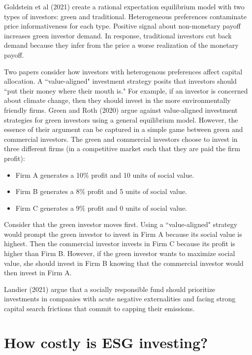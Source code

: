 \documentclass{article}
\begin{document}
Goldstein et al (2021) create a rational expectation equilibrium model with two types of investors: green and traditional. Heterogeneous preferences contaminate price informativeness for each type.  Positive signal about non-monetary payoff increases green investor demand.  In response, traditional investors cut back demand because they infer from the price a worse realization of the monetary payoff.

\bigskip

Two papers consider how investors with heterogenous preferences affect capital allocation. A ``value-aligned" investment strategy posits that investors should ``put their money where their mouth is."  For example, if an investor is concerned about climate change, then they should invest in the more environmentally friendly firms. Green and Roth (2020) argue against value-aligned investment strategies for green investors using a general equilibrium model. However, the essence of their argument can be captured in a simple game between green and commercial investors. The green and commercial investors choose to invest in three different firms (in a competitive market such that they are paid the firm profit):

\begin{itemize}
\item Firm A generates a 10\% profit and 10 units of social value.
\item Firm B generates a 8\% profit and 5 units of social value.
\item Firm C generates a 9\% profit and 0 units of social value.
\end{itemize}

Consider that the green investor moves first. Using a ``value-aligned" strategy would prompt the green investor to invest in Firm A because its social value is highest. Then the commercial investor invests in Firm C because its profit is higher than Firm B.  However, if the green investor wants to maximize social value, she should invest in Firm B knowing that the commercial investor would then invest in Firm A.

\bigskip

Landier (2021) argue that a socially responsible fund should prioritize investments in
companies with acute negative externalities and facing strong capital search frictions that commit to capping their emissions.

\section{How costly is ESG investing?}
\end{document}
